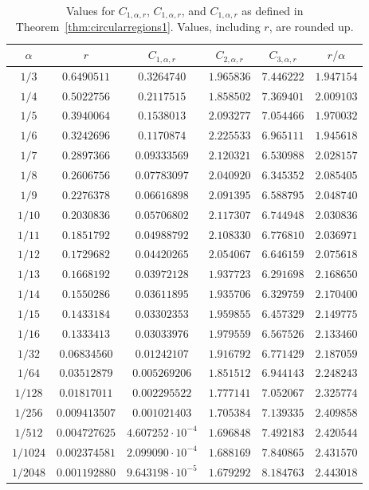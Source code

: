 \documentclass[10pt,english,letter, reqno]{amsart}
\theoremstyle{plain}
\theoremstyle{definition}
\begin{document}
\begin{table}
\caption{Values for $C_{1,\alpha,r}$, $C_{1,\alpha,r}$, and $C_{1,\alpha,r}$ as defined in Theorem~\ref{thm:circularregions1}. Values, including $r$, are rounded up.}\label{tab:CRvalues}
\begin{tabular}{|cc|ccc|c|}
\hline
$\alpha$ & $r$ & $C_{1,\alpha,r}$ & $C_{2,\alpha,r}$ & $C_{3,\alpha,r}$   & $r/\alpha$\\
\hline
$ 1/3 $&$0.6490511$&$0.3264740$&$1.965836$&$7.446222$&$1.947154$\\
$ 1/4 $&$0.5022756$&$0.2117515$&$1.858502$&$7.369401$&$2.009103$\\
$ 1/5 $&$0.3940064$&$0.1538013$&$2.093277$&$7.054466$&$1.970032$\\
$ 1/6 $&$0.3242696$&$0.1170874$&$2.225533$&$6.965111$&$1.945618$\\
$ 1/7 $&$0.2897366$&$0.09333569$&$2.120321$&$6.530988$&$2.028157$\\
$ 1/8 $&$0.2606756$&$0.07783097$&$2.040920$&$6.345352$&$2.085405$\\
$ 1/9 $&$0.2276378$&$0.06616898$&$2.091395$&$6.588795$&$2.048740$\\
$ 1/10 $&$0.2030836$&$0.05706802$&$2.117307$&$6.744948$&$2.030836$\\
$ 1/11 $&$0.1851792$&$0.04988792$&$2.108330$&$6.776810$&$2.036971$\\
$ 1/12 $&$0.1729682$&$0.04420265$&$2.054067$&$6.646159$&$2.075618$\\
$ 1/13 $&$0.1668192$&$0.03972128$&$1.937723$&$6.291698$&$2.168650$\\
$ 1/14 $&$0.1550286$&$0.03611895$&$1.935706$&$6.329759$&$2.170400$\\
$ 1/15 $&$0.1433184$&$0.03302353$&$1.959855$&$6.457329$&$2.149775$\\
$ 1/16 $&$0.1333413$&$0.03033976$&$1.979559$&$6.567526$&$2.133460$\\
$ 1/32 $&$0.06834560$&$0.01242107$&$1.916792$&$6.771429$&$2.187059$\\
$ 1/64 $&$0.03512879$&$0.005269206$&$1.851512$&$6.944143$&$2.248243$\\
$ 1/128 $&$0.01817011$&$0.002295522$&$1.777141$&$7.052067$&$2.325774$\\
$ 1/256 $&$0.009413507$&$0.001021403$&$1.705384$&$7.139335$&$2.409858$\\
$ 1/512 $&$0.004727625$&$4.607252\cdot 10^{-4}$&$1.696848$&$7.492183$&$2.420544$\\
$ 1/1024 $&$0.002374581$&$2.099090\cdot 10^{-4}$&$1.688169$&$7.840865$&$2.431570$\\
$ 1/2048 $&$0.001192880$&$9.643198\cdot 10^{-5}$&$1.679292$&$8.184763$&$2.443018$\\
\hline
\end{tabular}
\end{table}
\end{document}
